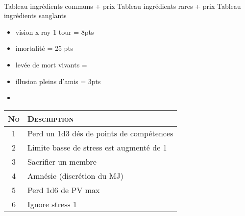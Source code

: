 \documentclass[11pt]{article} %
\newcommand{\scbf}[1]{\textsc{\textbf{#1}}}
\newcommand{\myjump}[1][1]{\mbox{}\\[#1cm]}
\begin{document}
\myjump
Tableau ingrédients communs + prix\newline
Tableau ingrédients rares + prix  \newline
Tableau ingrédients sanglants\newline




\begin{itemize}
    \item vision x ray 1 tour = 8pts
    \item imortalité = 25 pts
    \item levée de mort vivants =
    \item illusion pleins d'amis = 3pts
    \item
\end{itemize}


\begin{tabularx}{\linewidth}{|c|X|}
\hline
    \scbf{No} & \scbf{Description}\\
    \hline
    1 & Perd un 1d3 dés de points de compétences\\
    2 & Limite basse de stress est augmenté de 1\\
    3 & Sacrifier un membre\\
    4 & Amnésie (discrétion du MJ)\\
    5 & Perd 1d6 de PV max\\
    6 & Ignore stress 1\\\hline
\end{tabularx}
\end{document}
